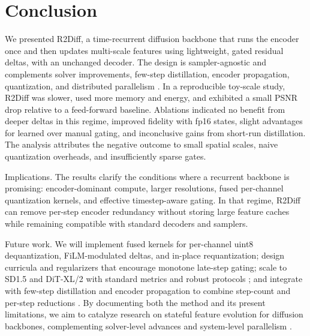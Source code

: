 \documentclass{article}
\begin{document}
\section{Conclusion}
We presented R2Diff, a time-recurrent diffusion backbone that runs the encoder once and then updates multi-scale features using lightweight, gated residual deltas, with an unchanged decoder. The design is sampler-agnostic and complements solver improvements, few-step distillation, encoder propagation, quantization, and distributed parallelism \cite{salimans-2024-multistep,huang-2024-reverse,li-2023-faster,shang-2022-post,li-2024-distrifusion}. In a reproducible toy-scale study, R2Diff was slower, used more memory and energy, and exhibited a small PSNR drop relative to a feed-forward baseline. Ablations indicated no benefit from deeper deltas in this regime, improved fidelity with fp16 states, slight advantages for learned over manual gating, and inconclusive gains from short-run distillation. The analysis attributes the negative outcome to small spatial scales, naive quantization overheads, and insufficiently sparse gates.

Implications. The results clarify the conditions where a recurrent backbone is promising: encoder-dominant compute, larger resolutions, fused per-channel quantization kernels, and effective timestep-aware gating. In that regime, R2Diff can remove per-step encoder redundancy without storing large feature caches while remaining compatible with standard decoders and samplers.

Future work. We will implement fused kernels for per-channel uint8 dequantization, FiLM-modulated deltas, and in-place requantization; design curricula and regularizers that encourage monotone late-step gating; scale to SD1.5 and DiT-XL/2 with standard metrics and robust protocols \cite{karras-2023-analyzing,li-2023-snapfusion}; and integrate with few-step distillation and encoder propagation to combine step-count and per-step reductions \cite{salimans-2024-multistep,li-2023-faster}. By documenting both the method and its present limitations, we aim to catalyze research on stateful feature evolution for diffusion backbones, complementing solver-level advances \cite{chen-2023-the,huang-2024-reverse} and system-level parallelism \cite{li-2024-distrifusion}.




\end{document}
